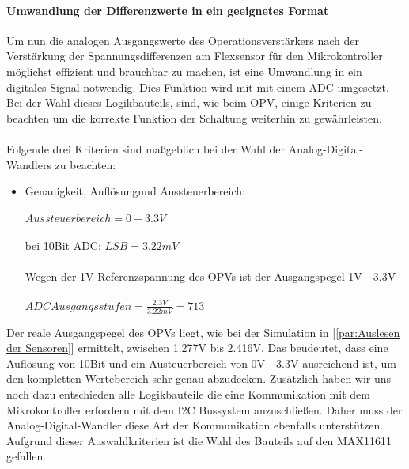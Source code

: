 \documentclass[titlepage,12pt,twoside]{article}
\begin{document}
\paragraph{Umwandlung der Differenzwerte in ein geeignetes Format}
\label{par:Umwandlung der Differenzwerte in ein geeignetes Format}
\hfill \break
\hfill \break
Um nun die analogen Ausgangswerte des Operationsverstärkers nach der Verstärkung der Spannungsdifferenzen am Flexsensor für
den Mikrokontroller möglichst effizient und brauchbar zu machen, ist eine Umwandlung in ein digitales Signal notwendig.
Dies Funktion wird mit mit einem ADC umgesetzt. Bei der Wahl dieses Logikbauteils, sind, wie beim OPV, einige Kriterien zu 
beachten um die korrekte Funktion der Schaltung weiterhin zu gewährleisten. \\
\\
Folgende drei Kriterien sind maßgeblich bei der Wahl der Analog-Digital-Wandlers zu beachten:
\begin{itemize}
	\item Genauigkeit, Auflösungund Aussteuerbereich: \\
		  \\
		  \hspace*{1cm} $ Aussteuerbereich = 0 - 3.3V $ \\
		  \\
		  \hspace*{1cm} bei 10Bit ADC: $ LSB = 3.22mV $ \\
		  \\
		  \hspace*{1cm} Wegen der 1V Referenzspannung des OPVs ist der Ausgangspegel 1V - 3.3V \\
		  \\
		  \hspace*{1cm} $ ADC Ausgangsstufen = \frac{2.3V}{3.22mV} = 713 $ \\
\end{itemize}
Der reale Ausgangspegel des OPVs liegt, wie bei der Simulation in [\textcolor{blue}{\autoref{par:Auslesen der Sensoren}}] ermittelt, zwischen 1.277V bis 2.416V.
Das beudeutet, dass eine Auflösung von 10Bit und ein Austeuerbereich von 0V - 3.3V ausreichend ist, um den kompletten Wertebereich
sehr genau abzudecken. Zusätzlich haben wir uns noch dazu entschieden alle Logikbauteile die eine Kommunikation mit dem Mikrokontroller
erfordern mit dem I2C Bussystem anzuschließen. Daher muss der Analog-Digital-Wandler diese Art der Kommunikation ebenfalls unterstützen.
Aufgrund dieser Auswahlkriterien ist die Wahl des Bauteils auf den MAX11611 gefallen.\\
\\
\end{document}
